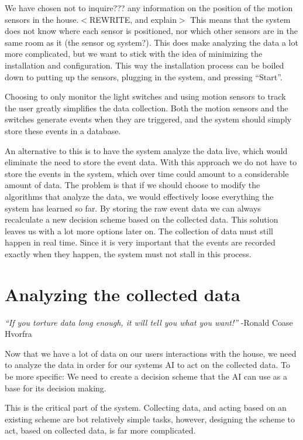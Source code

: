 We have chosen not to inquire??? any information on the position of the motion sensors in the house.$<$REWRITE, and explain$>$ This means that the system does not know where each sensor is positioned, nor which other sensors are in the same room as it (the sensor og system?). This does make analyzing the data a lot more complicated, but we want to stick with the idea of minimizing the installation and configuration. This way the installation process can be boiled down to putting up the sensors, plugging in the system, and pressing ``Start''.

Choosing to only monitor the light switches and using motion sensors to track the user greatly simplifies the data collection. Both the motion sensors and the switches generate events when they are triggered, and the system should simply store these events in a database. 

An alternative to this is to have the system analyze the data live, which would eliminate the need to store the event data. With this approach we do not have to store the events in the system, which over time could amount to a considerable amount of data. The problem is that if we should choose to modify the algorithms that analyze the data, we would effectively loose everything the system has learned so far. By storing the raw event data we can always recalculate a new decision scheme based on the collected data. This solution leaves us with a lot more options later on. The collection of data must still happen in real time. Since it is very important that the events are recorded exactly when they happen, the system must not stall in this process.

\section{Analyzing the collected data}
\label{analyzingthecollecteddata}

\emph{“If you torture data long enough, it will tell you what you want!”} -Ronald Coase Hvorfra

Now that we have a lot of data on our users interactions with the house, we need to analyze the data in order for our systems AI to act on the collected data. To be more specific: We need to create a decision scheme that the AI can use as a base for its decision making. 

This is the critical part of the system. Collecting data, and acting based on an existing scheme are bot relatively simple tasks, however, designing the scheme to act, based on collected data, is far more complicated.

